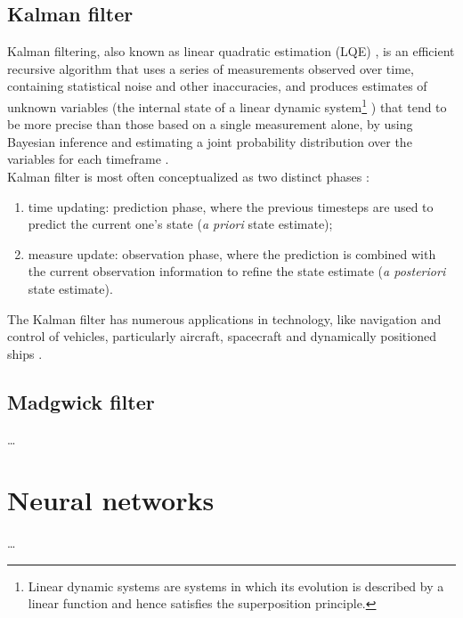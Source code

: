 \subsection{Kalman filter}
Kalman filtering, also known as linear quadratic estimation (LQE) \cite[ix]{Ma19}, is an efficient recursive algorithm that uses a series of measurements observed over time, containing statistical noise and other inaccuracies, and produces estimates of unknown variables \cite[7-8]{Ma19} (the internal state of a linear dynamic system\footnote{Linear dynamic systems are systems in which its evolution is described by a linear function and hence satisfies the superposition principle.} \cite[47]{Ma19}) that tend to be more precise than those based on a single measurement alone, by using Bayesian inference and estimating a joint probability distribution over the variables for each timeframe \cite[8]{Ma19}.\\
Kalman filter is most often conceptualized as two distinct phases \cite[12-13]{Ma19}:

\begin{enumerate}
	\item time updating: prediction phase, where the previous timesteps are used to predict the current one's state (\textit{a priori} state estimate);
	\item measure update: observation phase, where the prediction is combined with the current observation information to refine the state estimate (\textit{a posteriori} state estimate).
\end{enumerate}

The Kalman filter has numerous applications in technology, like navigation and control of vehicles, particularly aircraft, spacecraft and dynamically positioned ships \cite{WikipediaKalman}.

\subsection{Madgwick filter} \label{Madgwick filter}
\dots

\section{Neural networks}
\dots
